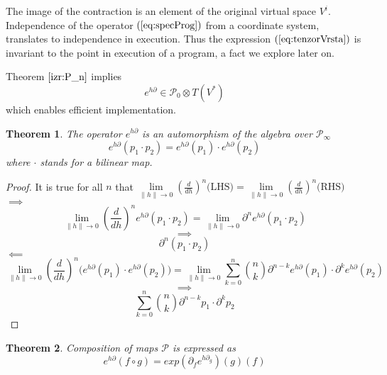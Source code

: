\documentclass{article}
\newcommand{\dP}{\mathcal{P}}
\newcommand{\D}{\partial}
\newtheorem{izrek}{Theorem}[section]
\begin{document}
 The image of the contraction is an element of the original virtual space $V^i$. Independence of the operator $(\ref{eq:specProg})$ from a coordinate system, translates to independence in execution. Thus the expression $(\ref{eq:tenzorVrsta})$ is invariant to the point in execution of a program, a fact we explore later on.  
 
 Theorem $\ref{izr:P_n}$ implies
     \begin{equation}
     	e^{h\D}\in\dP_0\otimes T(V^*)
     \end{equation}      
which enables efficient implementation.
 
 \begin{izrek}\label{izr:prod}
 The operator $e^{h\D}$ is an automorphism of the algebra over $\dP_\infty$
 \begin{equation}
 	e^{h\D}(p_1\cdot p_2)=e^{h\D}(p_1)\cdot e^{h\D}(p_2)
 \end{equation}
 where $\cdot$ stands for a bilinear map.
 \end{izrek}
 
 \begin{proof}
 It is true for all $n$ that $\lim\limits_{\lVert h\rVert\to 0}(\frac{d}{dh})^n\text{(LHS)}=\lim\limits_{\lVert h\rVert\to 0}(\frac{d}{dh})^n\text{(RHS)}$\\
  $\implies$
  $$\lim\limits_{\lVert h\rVert\to 0}(\frac{d}{dh})^ne^{h\D}(p_1\cdot p_2)=\lim\limits_{\lVert h\rVert\to 0}\D^ne^{h\D}(p_1\cdot p_2)$$
  $$\implies$$
  $$\D^n(p_1\cdot p_2)$$
  $\impliedby$
  $$\lim\limits_{\lVert h\rVert\to 0}(\frac{d}{dh})^n\Big(e^{h\D}(p_1)\cdot e^{h\D}(p_2)\Big)=\lim\limits_{\lVert h\rVert\to 0}\sum\limits_{k=0}^{n}{n\choose k}\D^{n-k}e^{h\D}(p_1)\cdot \D^ke^{h\D}(p_2)$$
  $$\implies$$
  $$\sum\limits_{k=0}^{n}{n\choose k}\D^{n-k}p_1\cdot \D^kp_2$$
 \end{proof}
 
 \begin{izrek}\label{izr:kompo}
 Composition of maps $\dP$ is expressed as
 \begin{equation}\label{eq:kompo}
 e^{h\D}(f\circ g)=exp(\D_fe^{h\D_g})(g)(f)
 \end{equation}
 \end{izrek}
 
\end{document}
